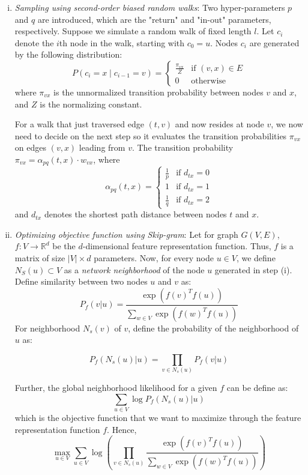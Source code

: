 \begin{enumerate}[(i)]
    \item \textit{Sampling using second-order biased random walks}: Two hyper-parameters \( p \) and \( q \) are introduced, which are the "return" and "in-out" parameters, respectively. Suppose we simulate a random walk of fixed length \( l \). Let \( c_i \) denote the \( i \)th node in the walk, starting with \( c_0 = u \). Nodes \( c_i \) are generated by the following distribution:
    \[
        P(c_i = x \mid c_{i-1} = v) =
        \begin{cases}
        \frac{\pi_{vx}}{Z} & \text{if } (v,x) \in E \\
        0 & \text{otherwise}
        \end{cases}
    \]
    where \( \pi_{vx} \) is the unnormalized transition probability between nodes \( v \) and \( x \), and \( Z \) is the normalizing constant.
    
    For a walk that just traversed edge \( (t,v) \) and now resides at node \( v \), we now need to decide on the next step so it evaluates the transition probabilities \( \pi_{vx} \) on edges \( (v,x) \) leading from \( v \). The transition probability \( \pi_{vx} = \alpha_{pq}(t,x)\cdot w_{vx} \), where 
    \[
        \alpha_{pq}(t,x) = 
        \begin{cases}
        \frac{1}{p}  & \text{if } d_{tx} = 0\\
        1 & \text{if } d_{tx} = 1\\
        \frac{1}{q} & \text{if } d_{tx} = 2
        \end{cases}
    \]
    and \( d_{tx} \) denotes the shortest path distance between nodes \( t \) and \( x \).

    \item \textit{Optimizing objective function using Skip-gram}: Let for graph \( G(V, E) \), \( f: V \rightarrow \mathbb{R}^d \) be the \( d \)-dimensional feature representation function. Thus, \( f \) is a matrix of size \( |V| \times d \) parameters. Now, for every node \( u \in V \), we define \( N_S(u) \subset V \) as a \emph{network neighborhood} of the node \( u \) generated in step (i). Define similarity between two nodes \( u \) and \( v \) as:
    \[
        P_f(v|u) = \frac{\exp(f(v)^T f(u))}{\sum_{w \in V} \exp(f(w)^T f(u))} \tag{1}
    \]
    For neighborhood \( N_s(v) \) of \( v \), define the probability of the neighborhood of \( u \) as:
    
    \[ P_f(N_s(u)|u) = \prod_{v \in N_s(u)} P_f(v|u) \tag{2} \]

    Further, the global neighborhood likelihood for a given \( f \) can be define as:
    \[ \sum_{u \in V} \log P_f(N_s(u)|u) \tag{3}\]
    which is the objective function that we want to maximize through the feature representation function \(f\). Hence,
     \[
    \max_{u \in V} \sum_{u \in V} \log \left( \prod_{v \in N_s(u)} \frac{\exp(f(v)^T f(u))}{\sum_{w \in V} \exp(f(w)^T f(u))} \right) \tag{4}
    \]
\end{enumerate}

